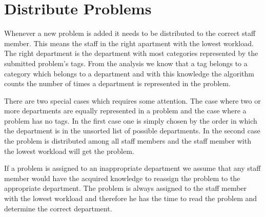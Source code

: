 \section{Distribute Problems}
\label{sec:dispro}
Whenever a new problem is added it needs to be distributed to the correct staff member.
This means the staff in the right apartment with the lowest workload. 
The right department is the department with most categories represented by the submitted problem's tags.
From the analysis we know that a tag belongs to a category which belongs to a department and with this knowledge the algorithm counts the number of times a department is represented in the problem.

There are two special cases which requires some attention. 
The case where two or more departments are equally represented in a problem and the case where a problem has no tags. 
In the first case one is simply chosen by the order in which the department is in the unsorted list of possible departments. 
In the second case the problem is distributed among all staff members and the staff member with the lowest workload will get the problem. 

If a problem is assigned to an inappropriate department we assume that any staff member would have the acquired knowledge to reassign the problem to the appropriate department. 
The problem is always assigned to the staff member with the lowest workload and therefore he has the time to read the problem and determine the correct department.